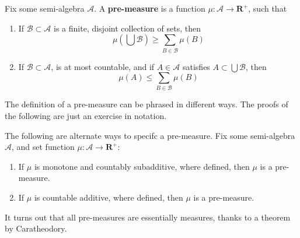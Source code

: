 \begin{definition}
    Fix some semi-algebra $\mathcal{A}$. A {\bf pre-measure} is a function $\mu:\mathcal{A} \to \mathbf{R}^+$, such that
    \begin{enumerate}
        \item If $\mathcal{B} \subset \mathcal{A}$ is a finite, disjoint collection of sets, then
        \[ \mu \left(\bigcup \mathcal{B} \right) \geq \sum_{B \in \mathcal{B}} \mu(B) \]
        \item If $\mathcal{B} \subset \mathcal{A}$, is at most countable, and if $A \in \mathcal{A}$ satisfies $A \subset \bigcup \mathcal{B}$, then
        \[ \mu(A) \leq \sum_{B \in \mathcal{B}} \mu(B) \]
    \end{enumerate}
\end{definition}

The definition of a pre-measure can be phrased in different ways. The proofs of the following are just an exercise in notation.

\begin{lemma}
    The following are alternate ways to specifc a pre-measure. Fix some semi-algebra $\mathcal{A}$, and set function $\mu:\mathcal{A} \to \mathbf{R}^+$:
    \begin{enumerate}
        \item If $\mu$ is monotone and countably subadditive, where defined, then $\mu$ is a pre-measure.
        \item If $\mu$ is countable additive, where defined, then $\mu$ is a pre-measure.
    \end{enumerate}
\end{lemma}

It turns out that all pre-measures are essentially measures, thanks to a theorem by Caratheodory.

